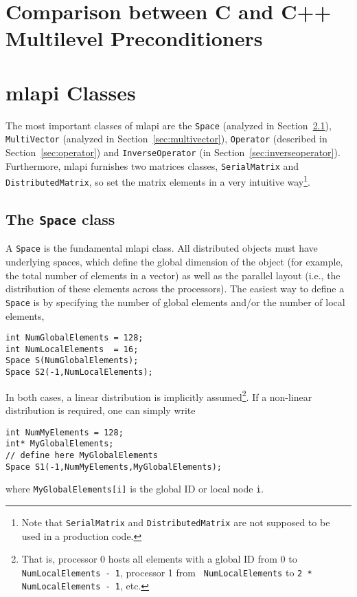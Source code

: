 \documentclass{article}[11pt]
\newcommand{\MLAPI}  {{\sc mlapi }}
\begin{document}
\section{Comparison between C and C++ Multilevel Preconditioners}

\section{\MLAPI Classes}
\label{sec:basic}

The most important classes of \MLAPI are the {\tt Space} 
(analyzed in Section~\ref{sec:space}), {\tt MultiVector}
(analyzed in Section~\ref{sec:multivector}),
{\tt Operator} (described in Section~\ref{sec:operator}) and 
{\tt InverseOperator} (in Section~\ref{sec:inverseoperator}). Furthermore,
\MLAPI furnishes two matrices classes, {\tt SerialMatrix} and {\tt
  DistributedMatrix}, so set the matrix elements in a very intuitive 
  way\footnote{Note that {\tt SerialMatrix} and {\tt DistributedMatrix} 
    are not supposed to be used in a production code.}.

\subsection{The {\tt Space} class}
\label{sec:space}

A {\tt Space} is the fundamental \MLAPI class. All distributed objects must have
underlying spaces, which define the global dimension of the object 
(for example, the total number of elements in a vector) as well as the
 parallel layout (i.e., the distribution of these elements across the
processors). The easiest way to define a {\tt Space} is by specifying the
number of global elements 
and/or the number of local elements,
\begin{verbatim}
int NumGlobalElements = 128;
int NumLocalElements  = 16;
Space S(NumGlobalElements);
Space S2(-1,NumLocalElements);
\end{verbatim}
In both cases, a linear distribution is implicitly 
assumed\footnote{That is, processor 0 hosts all elements with a global ID
  from 0 to {\tt NumLocalElements - 1}, processor 1 from {\tt
    NumLocalElements} to {\tt 2 * NumLocalElements - 1}, etc.}. If a non-linear
distribution is required, one can simply write
\begin{verbatim}
int NumMyElements = 128;
int* MyGlobalElements;
// define here MyGlobalElements
Space S1(-1,NumMyElements,MyGlobalElements);
\end{verbatim}
where {\tt MyGlobalElements[i]} is the global ID or local node {\tt i}.
\end{document}
